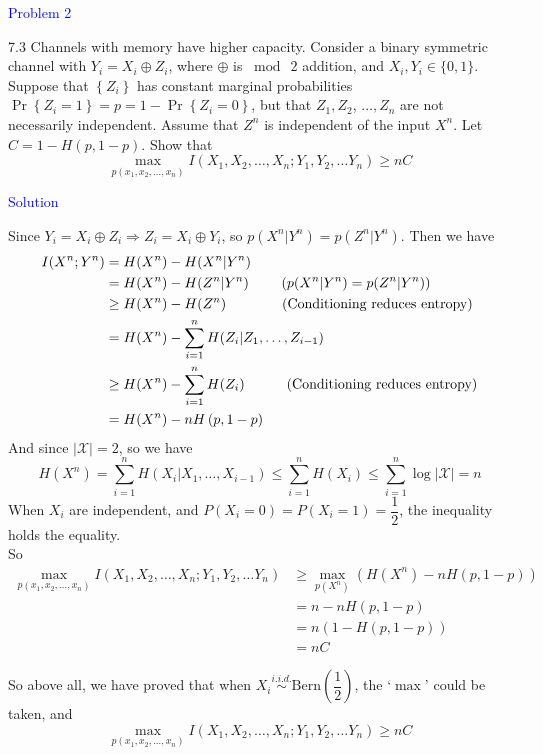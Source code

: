 \textcolor{blue}{Problem 2}

7.3 Channels with memory have higher capacity. Consider a binary symmetric channel with $Y_i=X_i \oplus Z_i$, where $\oplus$ is $\bmod\ 2$ addition, and $X_i, Y_i \in\{0,1\}$. Suppose that $\left\{Z_i\right\}$ has constant marginal probabilities $\operatorname{Pr}\left\{Z_i=1\right\}=p=1-\operatorname{Pr}\left\{Z_i=0\right\}$, but that $Z_1, Z_2$, $\ldots, Z_n$ are not necessarily independent. Assume that $Z^n$ is independent of the input $X^n$. Let $C=1-H(p, 1-p)$. Show that
$$\max\limits_{p\left(x_1, x_2, \ldots, x_n\right)} I\left(X_1, X_2, \ldots, X_n ; Y_1, Y_2, \ldots Y_n\right) \geq n C$$

\textcolor{blue}{Solution}

Since $Y_i=X_i \oplus Z_i\Rightarrow Z_i = X_i \oplus Y_i$, so $p(X^n|Y^n)=p(Z^n|Y^n)$. Then we have
\begin{align*}
I(X^n;Y^n) &= H(X^n) - H(X^n|Y^n) \\
&= H(X^n) - H(Z^n|Y^n) \text{\qquad\ ($p(X^n|Y^n)=p(Z^n|Y^n)$)} \\
&\geq H(X^n) - H(Z^n) \text{\qquad\qquad (Conditioning reduces entropy)} \\
&= H(X^n) -\sum_{i=1}^n H(Z_i|Z_1, \ldots, Z_{i-1}) \\
&\geq H(X^n) -\sum_{i=1}^n H(Z_i) \text{\qquad\quad (Conditioning reduces entropy)} \\
&= H(X^n) - nH\left(p,1-p\right)
\end{align*}
And since $\left|\mathcal{X}\right|=2$, so we have
$$H(X^n)=\sum\limits_{i=1}^n H(X_i|X_1,\ldots,X_{i-1}) \leq \sum\limits_{i=1}^n H(X_i) \leq \sum\limits_{i=1}^n \log \left|\mathcal{X}\right| = n$$
When $X_i$ are independent, and $P(X_i=0)=P(X_i=1)=\dfrac{1}{2}$, the inequality holds the equality. \\
So
\begin{align*}
\max\limits_{p\left(x_1, x_2, \ldots, x_n\right)} I\left(X_1, X_2, \ldots, X_n ; Y_1, Y_2, \ldots Y_n\right) &\geq \max_{p(X^n)} \left(H(X^n) - nH\left(p,1-p\right)\right) \\
&= n - nH\left(p,1-p\right) \\
&= n\left(1 - H\left(p,1-p\right)\right) \\
&= nC
\end{align*}

So above all, we have proved that when $X_i\stackrel{i.i.d.}{\sim} \text{Bern}\left(\dfrac{1}{2}\right)$, the `$\max$' could be taken, and
$$\max\limits_{p\left(x_1, x_2, \ldots, x_n\right)} I\left(X_1, X_2, \ldots, X_n ; Y_1, Y_2, \ldots Y_n\right) \geq n C$$

\newpage